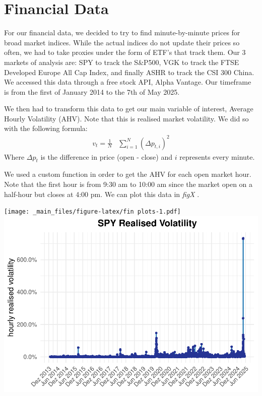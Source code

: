 \documentclass[
]{book}
\begin{document}
\section{Financial Data}\label{financial-data}

For our financial data, we decided to try to find minute-by-minute prices for
broad market indices. While the actual indices do not update their prices so often,
we had to take proxies under the form of ETF's that track them. Our 3 markets of
analysis are: SPY to track the S\&P500, VGK to track the FTSE Developed Europe
All Cap Index, and finally ASHR to track the CSI 300 China. We accessed this data
through a free stock API, Alpha Vantage. Our timeframe is from the first
of January 2014 to the 7th of May 2025.

We then had to transform this data to get our main variable of interest, Average
Hourly Volatility (AHV). Note that this is realised market volatility. We did so
with the following formula:
\[
\begin{aligned}
  v_t = \frac{1}{N}&\sum_{i=1}^N(\Delta p_{t,i})^2 
\end{aligned}
\]
Where \(\Delta p_t\) is the difference in price (open - close) and \(i\) represents
every minute.

We used a custom function in order to get the AHV for each open market hour. Note
that the first hour is from 9:30 am to 10:00 am since the
market open on a half-hour but closes at 4:00 pm. We can plot this data in
{ \emph{figX} }.

\texttt{[image: \_main\_files/figure-latex/fin plots-1.pdf]} \includegraphics{_main_files/figure-latex/fin plots-2.pdf}
\end{document}
